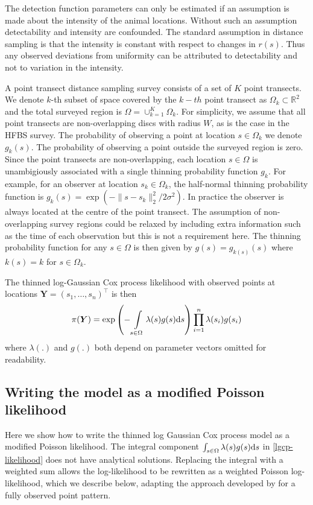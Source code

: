 \documentclass[preprint,12pt]{elsarticle}
\newcommand{\bm}{\boldsymbol}  %
\begin{document}
The detection function parameters can only be estimated if an assumption is made about the intensity of the animal locations.  Without such an assumption detectability and intensity are confounded.  The standard assumption in distance sampling is that the intensity is constant with respect to changes in $r(s)$.  Thus any observed deviations from uniformity can be attributed to detectability and not to variation in the intensity.

A point transect distance sampling survey consists of a set of $K$ point transects.   We denote $k$-th subset of space covered by the $k-th$ point transect as $\Omega_k \subset \mathbb{R}^2$ and the total surveyed region is $\Omega = \cup_{k=1}^K \Omega_k$.  For simplicity, we assume that all point transects are non-overlapping discs with radius $W$, as is the case in the HFBS survey.  The probability of observing a point at location $s \in \Omega_k$ we denote $g_k(s)$.  The probability of observing a point outside the surveyed region is zero.
Since the point transects are non-overlapping, each location $s \in \Omega$ is unambigiously associated with a single thinning probability function $g_k$.  For example, for an observer at location $s_k \in \Omega_k$, the half-normal thinning probability function is $g_k(s) = \exp(-\lVert s - s_k \rVert_2^2 / 2\sigma^2)$.  In practice the observer is always located at the centre of the point transect.  The assumption of non-overlapping survey regions could be relaxed by including extra information such as the time of each observation but this is not a requirement here.  The thinning probability function for any $s \in \Omega$ is then given by $g(s) = g_{k(s)}(s)$ where $k(s) = k$ for $s \in \Omega_k$.

The thinned log-Gaussian Cox process likelihood with observed points at locations $\bm{Y} = (s_1, \ldots, s_n)^\intercal$ is then
\begin{equation}
\label{lgcp-likelihood}
\pi(\bm{Y}) = \exp\left(-\int\displaylimits_{s \in \Omega} \lambda(s) g(s) \mathrm{d}s \right)\prod_{i=1}^n \lambda(s_i)g(s_i)
\end{equation}
where $\lambda(.)$ and $g(.)$ both depend on parameter vectors omitted for readability.  

\subsection{Writing the model as a modified Poisson likelihood}

Here we show how to write the thinned log Gaussian Cox process model as a modified Poisson likelihood.  The integral component $\int\displaylimits_{s \in \Omega} \lambda(s) g(s) \mathrm{d}s$ in \autoref{lgcp-likelihood} does not have analytical solutions.  Replacing the integral with a weighted sum allows the log-likelihood to be rewritten as a weighted Poisson log-likelihood, which we describe below, adapting the approach developed by \cite{simpson_going_2016} for a fully observed point pattern.
\end{document}
